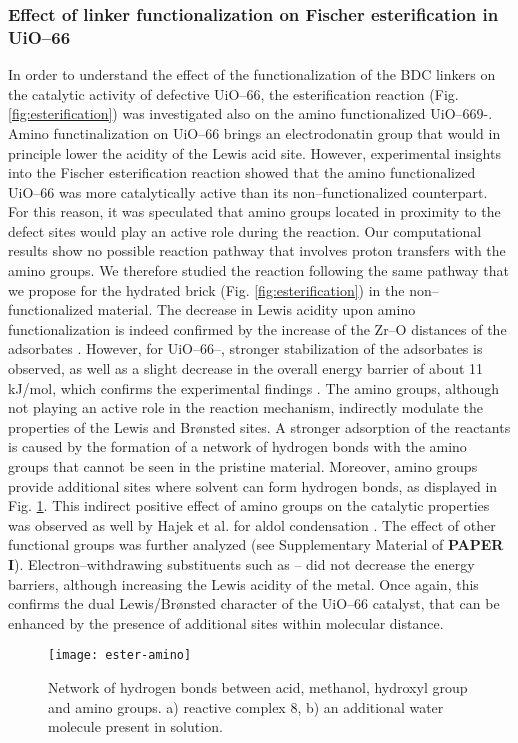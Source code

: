 \subsubsection{Effect of linker functionalization on Fischer esterification in UiO--66}
In order to understand the effect of the functionalization of the BDC linkers on the catalytic activity of defective UiO--66, the esterification reaction (Fig. \ref{fig:esterification}) was investigated also on the amino functionalized UiO--669-.  Amino functinalization on UiO--66 brings an electrodonatin group that would in principle lower the acidity of the Lewis acid site. However, experimental insights into the Fischer esterification reaction showed that the amino functionalized UiO--66 was more catalytically active than its non--functionalized counterpart. For this reason, it was speculated that amino groups located in proximity to the defect sites would play an active role during the reaction. Our computational results show no possible reaction pathway that involves proton transfers with the amino groups. We therefore studied the reaction following the same pathway that we propose for the hydrated brick (Fig. \ref{fig:esterification}) in the non--functionalized material. The decrease in Lewis acidity upon amino functionalization is indeed confirmed by the increase of the Zr--O distances of the adsorbates \cite{vermoortele2012electronic}. However, for UiO--66--, stronger stabilization of the adsorbates is observed, as well as a slight decrease in the overall energy barrier of about 11 kJ/mol, which confirms the experimental findings \cite{cirujano2015conversion, cirujano2015zirconium}. The amino groups, although not playing an active role in the reaction mechanism, indirectly modulate the properties of the Lewis and Br\o{}nsted sites. A stronger adsorption of the reactants is caused by the formation of a network of hydrogen bonds with the amino groups that cannot be seen in the pristine material. Moreover, amino groups provide additional sites where solvent can form hydrogen bonds, as displayed in Fig. \ref{fig:ester-amino}. This indirect positive effect of amino groups on the catalytic properties was observed as well by Hajek et al. for aldol condensation \cite{vandichel2015active}. The effect of other functional groups was further analyzed (see Supplementary Material of \textbf{PAPER I}). Electron--withdrawing substituents such as -- did not decrease the energy barriers, although increasing the Lewis acidity of the metal. Once again, this confirms the dual Lewis/Br\o{}nsted character of the UiO--66 catalyst, that can be enhanced by the presence of additional sites within molecular distance. 
\begin{figure}[!htbp]
	\centering
	\texttt{[image: ester-amino]}
	\caption{Network of hydrogen bonds between acid, methanol, hydroxyl group and amino groups. a) reactive complex 8, b) an additional water molecule present in solution.}
	\label{fig:ester-amino}
\end{figure}


